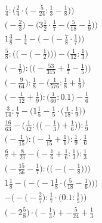 \documentclass[8pt]{article}
\begin{document}
\begin{align}
\frac{1}{4} : \Big(\frac{2}{4} \cdot \big(-\frac{5}{24} : \frac{1}{3} - \frac{1}{8}\big)\Big) \\
\Big(-\frac{2}{3}\Big) - \Big(3\frac{1}{2} \cdot \frac{1}{7} - \big(\frac{5}{18} - \frac{1}{9}\big)\Big) \\
1\frac{3}{8} - \frac{1}{4} - \Big(-\big(-\frac{7}{8} \cdot \frac{1}{7}\big)\Big) \\
\frac{5}{8} : \bigg(\Big(-\big(-\frac{1}{2}\big)\Big)\bigg) - \bigg(\frac{1}{12} : \frac{1}{3}\bigg) \\
\Big(-\frac{1}{9}\Big) : \Big(\big(-\frac{53}{315} + \frac{1}{7} - \frac{1}{5}\big)\Big) \\
\big(-\frac{9}{64}\big) : \frac{1}{8} - \big(\frac{1}{576} : \frac{1}{8} + \frac{1}{9}\big) \\
\big(-\frac{1}{12} + \frac{1}{9}\big) : \big(\frac{1}{60} : 0.1\big) - \frac{1}{6} \\
\frac{3}{14} : \frac{1}{7} - \Big(1\frac{1}{5} - \frac{1}{5} \cdot \big(\frac{1}{18} : \frac{1}{9}\big)\Big) \\
\frac{16}{63} - \bigg(\frac{1}{42} : \Big(\big(-\frac{1}{3}\big) + \frac{1}{6}\Big)\bigg) : \frac{1}{9} \\
\big(-\frac{1}{15}\big) : \big(-\frac{1}{15} + \frac{1}{6}\big) : \frac{1}{9} \cdot \frac{1}{6} \\
\frac{6}{7} + \frac{8}{21} - \big(-\frac{1}{6} + \frac{1}{6} : \frac{1}{3}\big) : \frac{1}{3} \\
\bigg(-\frac{15}{56} - \frac{1}{7}\bigg) : \bigg(\Big(-\big(-\frac{1}{8}\big)\Big)\bigg) \\
1\frac{1}{8} - \bigg(-\Big(-1\frac{1}{8} \cdot \big(\frac{5}{18} - \frac{1}{6}\big)\Big)\bigg) \\
-\Big(-\big(-\frac{2}{7}\big) : \frac{1}{7} \cdot \big(0.1 : \frac{1}{5}\big)\Big) \\
\big(-2\frac{5}{8}\big) \cdot \big(-\frac{1}{3}\big) + -\frac{5}{24} + \frac{1}{3}
\end{align}
\end{document}

